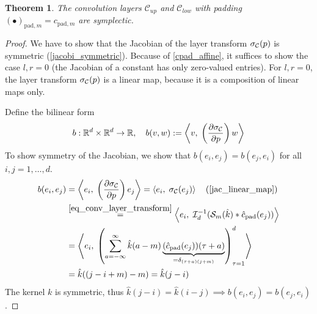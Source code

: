 \documentclass[twoside,a4paper]{article}
\newtheorem{theorem}{Theorem}
\begin{document}
\begin{theorem}\label{thm_conv_const_pad_symplectic}
	The convolution layers $\mathcal{C}_{up}$ and $\mathcal{C}_{low}$
	with padding $(\bullet)_{\text{pad},m} = c_{\text{pad},m}$ are symplectic.
\end{theorem}
\begin{proof}
	We have to show that the Jacobian of the layer transform $\sigma_{\mathcal{C}}(p)$
	is symmetric (\cref{jacobi_symmetric}).
	Because of \cref{cpad_affine}, it suffices to show the case $l,r=0$ (the Jacobian
	of a constant has only zero-valued entries). For $l,r=0$, the layer transform 
	$\sigma_{\mathcal{C}}(p)$ 
	is a linear map, because it is a composition of linear maps only.

	Define the bilinear form
	\begin{equation}\label{eq_bilinear_proof_conv}
		b : \mathbb{R}^d \times \mathbb{R}^d \to \mathbb{R},
		\quad b(v,w) := \left\langle v,\; \left( \frac{\partial \sigma_{\mathcal{C}}}{\partial p} \right) w \right\rangle
	\end{equation}
	To show symmetry of the Jacobian, we show that 
	$b(e_i, e_j) = b(e_j, e_i)$ for all $i,j=1,\dots,d$.
	\begin{align*}
		b(e_i, e_j) &= \ip{e_i}{\lb \jac{\activation_{\mathcal{C}}}{p} \rb e_j}
		= \ip{e_i}{\activation_{\mathcal{C}}(e_j)} \quad \text{(\cref{jac_linear_map})} \\
		&\stackrel{\cref{eq_conv_layer_transform}}{=} \ip{e_i}{\mathcal{I}_{d}^{-1} (
			\mathcal{S}_{m}(\hat{k}) * \hat{c}_{\text{pad}}(e_j)
		)} \\
		&= \ip{e_i}{
			\lb \sum_{a=-\infty}^{\infty} 
				\hat{k}(a-m)
				\underbrace{(\hat{c}_{\text{pad}}(e_j))(\tau+a)}_{
					= \delta_{(\tau+a) (j+m)}
				}
			\rb_{\tau=1}^d
		} \\
		&= \hat{k}((j-i+m)-m) = \hat{k}(j-i)
	\end{align*}
	The kernel $k$ is symmetric, thus $\hat{k}(j-i) = \hat{k}(i-j) \implies b(e_i, e_j) = b(e_j,e_i)$.
\end{proof}
\end{document}
